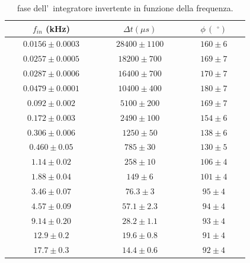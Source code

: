 \documentclass[10pt,a4paper]{article}
\newcommand{\exn}{\phantom{xxx}}
\begin{document}
\begin{table}[h]
		\caption{ fase dell'~integratore invertente in funzione della frequenza.}
		\label{tab:bodeinte}
		\begin{center}
			\begin{tabular}{|c|c|c|}
				\hline
				$f_{in}$ (kHz)  & $\Delta t (\mu s)$ & $\phi \,(\,\,^\circ)$ \\
				\hline


				$\exn0.0156 \pm0.0003 \exn $& $\exn 28400\pm 1100  \exn $ & $\exn160 \pm6\exn $ \\
				\hline
				$\exn 0.0257\pm0.0005 \exn $ &$\exn 18200\pm 700 \exn $ & $\exn169 \pm 7 \exn $ \\

					
				\hline
				$\exn0.0287 \pm0.0006 \exn $  & $\exn16400 \pm   700\exn $ & $\exn 170\pm 7\exn $ \\

				\hline
				$\exn 0.0479\pm0.0001 \exn $ & $\exn10400 \pm 400 \exn $ & $\exn 180\pm 7 \exn $ \\
				
				\hline
				$\exn 0.092\pm 0.002\exn $  & $\exn 5100\pm 200\exn $ & $\exn169\pm7\exn $ \\
				\hline

				$\exn0.172 \pm0.003 \exn $  & $\exn 2490\pm   100  \exn $ & $\exn 154\pm6 \exn $ \\
				\hline
				$\exn0.306 \pm0.006 \exn $  & $\exn1250 \pm 50 \exn $ & $\exn138 \pm 6\exn $ \\
				\hline
				
				
				
				$\exn 0.460\pm0.05 \exn $& $\exn785 \pm 30 \exn $ & $\exn130 \pm5  \exn $ \\
				\hline
				$\exn 1.14\pm 0.02\exn $  & $\exn258 \pm  10  \exn $ & $\exn106 \pm 4\exn $ \\
				\hline
				$\exn 1.88\pm0.04 \exn $  & $\exn 149 \pm  6 \exn $ & $\exn101 \pm 4 \exn $ \\
				\hline
				$\exn 3.46\pm 0.07 \exn $  & $\exn 76.3 \pm3
   \exn $ & $\exn95 \pm 4\exn $ \\
				\hline
				$\exn4.57 \pm0.09 \exn $  & $\exn 57.1 \pm  2.3    \exn $ & $\exn94 \pm4\exn $ \\
				\hline

				$\exn 9.14\pm 0.20\exn $ & $\exn28.2 \pm 1.1   \exn $ & $\exn 93 \pm 4 \exn $ \\
				\hline

				$\exn 12.9\pm 0.2 \exn $  & $\exn 19.6 \pm 0.8 \exn $ & $\exn 91 \pm  4\exn $ \\
				\hline
				$\exn 17.7\pm 0.3\exn $ & $\exn14.4\pm 0.6 \exn $ & $\exn 92\pm4\exn $ \\


\end{tabular}
\end{center}
\end{table}
\end{document}
